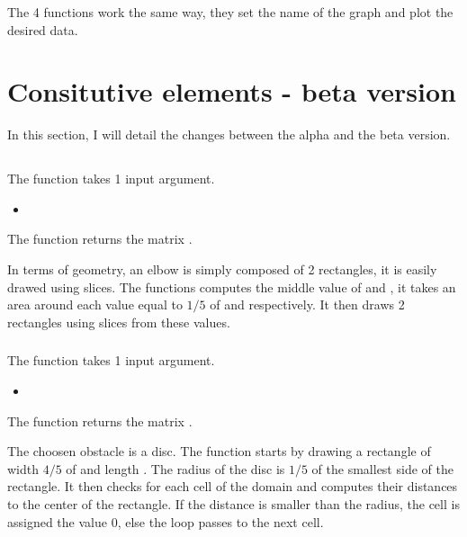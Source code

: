 The 4 functions work the same way, they set the name of the graph and plot the
desired data.

\section{Consitutive elements - beta version}
In this section, I will detail the changes between the alpha and the beta
version.

\subsection{}
\subsubsection{}
The function \textcolor{func}{} takes 1 input argument.
\begin{itemize}
      \item {} \textcolor{dtype}{}
\end{itemize}
The function returns the matrix .

In terms of geometry, an elbow is simply composed of 2 rectangles, it is easily
drawed using slices. The functions computes the middle value of  and
, it takes an area around each value equal to $1/5$ of  and
 respectively. It then draws 2 rectangles using slices from these
values.

\subsubsection{}
The function \textcolor{func}{} takes 1 input argument.
\begin{itemize}
      \item {} \textcolor{dtype}{}
\end{itemize}
The function returns the matrix .

The choosen obstacle is a disc. The function starts by drawing a rectangle of
width $4/5$ of  and length . The radius of the disc is $1/5$ of
the smallest side of the rectangle. It then checks for each cell of the domain
and computes their distances to the center of the rectangle. If the distance is
smaller than the radius, the cell is assigned the value 0, else the loop passes
to the next cell.

\subsection{}
